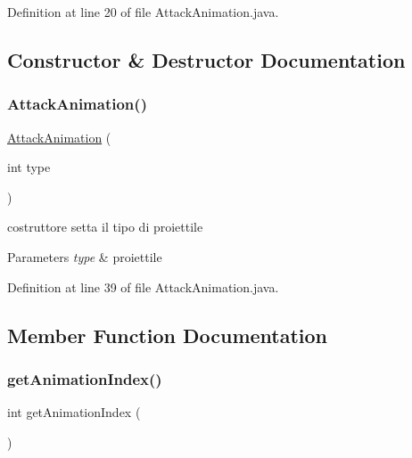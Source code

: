 Definition at line 20 of file Attack\+Animation.\+java.



\subsection{Constructor \& Destructor Documentation}
\mbox{\label{classtowers_1_1_attack_animation_aa2f7222a5c2212052a4024e1f88e0f90}} 
\subsubsection{\texorpdfstring{Attack\+Animation()}{AttackAnimation()}}
{\footnotesize\ttfamily \hyperlink{classtowers_1_1_attack_animation}{Attack\+Animation} (\begin{DoxyParamCaption}\item[{int}]{type }\end{DoxyParamCaption})}



costruttore setta il tipo di proiettile 


\begin{DoxyParams}{Parameters}
{\em type} & proiettile \\
\hline
\end{DoxyParams}


Definition at line 39 of file Attack\+Animation.\+java.



\subsection{Member Function Documentation}
\mbox{\label{classtowers_1_1_attack_animation_ae8c4fe920791c4525eb1a9ab79d1e3b7}} 
\subsubsection{\texorpdfstring{get\+Animation\+Index()}{getAnimationIndex()}}
{\footnotesize\ttfamily int get\+Animation\+Index (\begin{DoxyParamCaption}{ }\end{DoxyParamCaption})}



